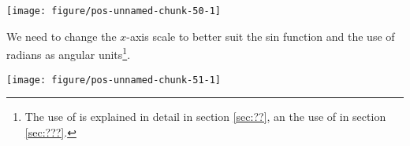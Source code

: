 \documentclass[paper=a4,10pt,div=17,headsepline,BCOR=12mm,twoside,open=right]{scrbook}\usepackage{knitr}
\begin{document}
\begin{knitrout}\footnotesize
{}\color{fgcolor}\begin{kframe}
\begin{alltt}
\hlstd{(}\hlstd{(}\hlstd{=}\hlstd{(}\hlstd{,}  \hlopt{*}  \hlstd{(} \hlopt{+}
  \hlstd{(}
\end{alltt}
\end{kframe}

{\centering \texttt{[image: figure/pos-unnamed-chunk-50-1]} 

}



\end{knitrout}

We need to change the $x$-axis scale to better suit the sin function and the use of radians as angular units\footnote{The use of  is explained in detail in section \ref{sec:??}, an the use of  in section \ref{sec:???}.}.

\begin{knitrout}\footnotesize
{}\color{fgcolor}\begin{kframe}
\begin{alltt}
\hlstd{(}\hlstd{(}\hlstd{=}\hlstd{(}\hlstd{,}  \hlopt{*}  \hlstd{(} \hlopt{+}
  \hlstd{(} \hlopt{+}
  \hlstd{(}
    \hlstd{=}\hlstd{(}\hlstd{,} \hlstd{,} \hlstd{,} \hlstd{,} \hlstd{)} \hlopt{*} 
    \hlstd{=}\hlstd{(}\hlstd{,} \hlstd{(}\hlopt{~} 
             \hlstd{(}\hlopt{~} \hlstd{(}\hlopt{~} \hlopt{+}
  \hlstd{(}\hlstd{=}\hlstd{)}
\end{alltt}
\end{kframe}

{\centering \texttt{[image: figure/pos-unnamed-chunk-51-1]} 

}



\end{knitrout}
\end{document}
